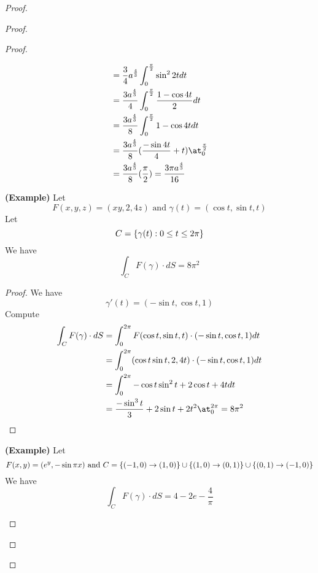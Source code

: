 \documentclass{report}
\begin{document}
\begin{proof}
\begin{proof}
\begin{proof}
\begin{theorem}
\begin{align}
  &=\frac{3}{4}a^{\frac{4}{3}}\int_0^{\frac{\pi}{2}} \sin^2 2t dt\\
  &=\frac{3a^{\frac{4}{3}}}{4}\int_0^{\frac{\pi}{2}} \frac{1-\cos 4t}{2}dt\\
  &=\frac{3a^{\frac{4}{3}}}{8}\int_0^{\frac{\pi}{2}} 1-\cos 4t dt\\
  &=\frac{3a^{\frac{4}{3}}}{8} (\frac{-\sin 4t}{4}+t)\at_{0}^{\frac{\pi}{2}}\\
  &=\frac{3a^{\frac{4}{3}}}{8}(\frac{\pi}{2})=\frac{3\pi a^{\frac{4}{3}}}{16}
\end{align}

\end{theorem}
\begin{theorem}
\label{7.1.8}
\textbf{(Example)} Let
\begin{equation}
F(x,y,z)=(xy,2,4z)\text{ and }\gamma (t)=(\cos t,\sin t,t)
\end{equation}
Let 
\begin{equation}
C=\{ \gamma (t):0\leq t\leq 2\pi  \}
\end{equation}
We have
\begin{equation}
\int_C F(\gamma )\cdot dS=8\pi^2
\end{equation}
\end{theorem}
\begin{proof}
We have
\begin{equation}
\gamma '(t)=(-\sin t,\cos t,1)
\end{equation}
Compute
\begin{align}
\int_C F(\gamma )\cdot dS&= \int_0^{2\pi} F(\cos t,\sin t,t)\cdot (-\sin t, \cos t,1)dt\\
&=\int_0^{2\pi} (\cos t\sin t, 2, 4t)\cdot (-\sin t,\cos t,1)dt\\
&=\int_0^{2\pi} -\cos t\sin^2 t+2\cos t+4tdt\\
&=\frac{-\sin^3 t}{3}+2\sin t+2t^2 \at_{0}^{2\pi}=8\pi^2
\end{align}
\end{proof}
\begin{theorem}
\label{7.1.9}
\textbf{(Example)} Let
\begin{equation}
F(x,y)=(e^{y},-\sin \pi x)\text{ and }C=\{ (-1,0)\to (1,0) \}\cup \{ (1,0)\to (0,1) \}\cup \{ (0,1)\to (-1,0) \}
\end{equation}
We have
\begin{equation}
\int_C F(\gamma )\cdot dS=4-2e-\frac{4}{\pi}

\end{equation}
\end{theorem}
\end{proof}
\end{proof}
\end{proof}
\end{document}
